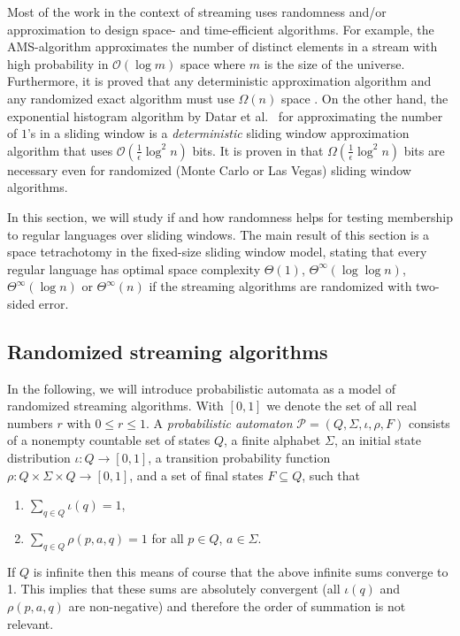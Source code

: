 \documentclass{article}\usepackage[a4paper,margin=20mm]{geometry}
\renewcommand{\O}{\mathcal{O}}
\renewcommand{\P}{\mathcal{P}}
\renewcommand{\leq}{\leqslant}
\newcommand{\Thetainf}{\Theta^{\scriptscriptstyle{\infty}}}
\begin{document}
Most of the work in the context of streaming uses randomness and/or approximation
to design space- and time-efficient algorithms.
For example, the AMS-algorithm \cite{AlonMS99} approximates the number of distinct elements
in a stream with high probability in $\O(\log m)$ space where $m$ is the size of the universe.
Furthermore, it is proved that any deterministic approximation algorithm and any randomized
exact algorithm must use $\Omega(n)$ space \cite{AlonMS99}.
On the other hand, the exponential histogram algorithm by Datar et al.~\cite{DatarGIM02} for approximating
the number of $1$'s in a sliding window is a
{\em deterministic} sliding window approximation algorithm that uses $\O(\frac{1}{\epsilon} \log^2 n)$ bits.
It is proven in \cite{DatarGIM02} that $\Omega(\frac{1}{\epsilon} \log^2 n)$ bits are necessary
even for randomized (Monte Carlo or Las Vegas) sliding window algorithms.

In this section, we will study if and how randomness helps for testing membership to regular languages
over sliding windows.
The main result of this section is a space tetrachotomy in the fixed-size sliding window model,
stating that every regular language has optimal space complexity $\Theta(1)$, $\Thetainf(\log \log n)$,
$\Thetainf(\log n)$ or $\Thetainf(n)$ if the streaming algorithms are randomized with two-sided error.

\subsection{Randomized streaming algorithms}

In the following, we will introduce probabilistic automata \cite{Paz71,Rabin63}
as a model of randomized streaming algorithms. With $[0,1]$ we denote the set of all real numbers $r$ with $0 \leq r \leq 1$.
A {\em probabilistic automaton} $\P = (Q,\Sigma,\iota,\rho,F)$
consists of a nonempty countable set of states $Q$,
a finite alphabet $\Sigma$,
an initial state distribution $\iota \colon Q \to [0,1]$,
a transition probability function $\rho \colon Q \times \Sigma \times Q \to [0,1]$,
and a set of final states $F \subseteq Q$,
such that
\begin{enumerate}[label=(\roman{*}), ref=(\roman{*})]
\item $\sum_{q \in Q} \iota(q) = 1$,
\item $\sum_{q \in Q} \rho(p,a,q) = 1$ for all $p \in Q$, $a \in \Sigma$.
\end{enumerate}
If $Q$ is infinite then this means of course that the above infinite sums converge to 1. 
This implies that these sums are absolutely convergent 
(all $\iota(q)$ and $\rho(p,a,q)$ are non-negative) and therefore the order of summation
is not relevant.
\end{document}
